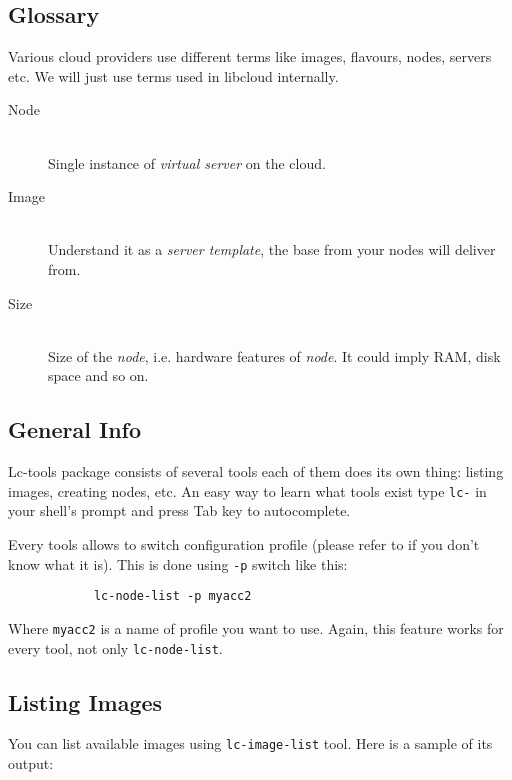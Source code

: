 \documentclass[a4paper]{report}
\begin{document}
         \subsection{Glossary}
            Various cloud providers use different terms like images, flavours, nodes,
            servers etc. We will just use terms used in libcloud internally. 

            \begin{description}
               \item[Node] \hfill \\
               Single instance of \textit{virtual server} on the cloud. 
               \item[Image] \hfill \\
               Understand it as a \textit{server template}, the base from your nodes
               will deliver from.
               \item[Size] \hfill \\
               Size of the \textit{node}, i.e. hardware features of \textit{node}. 
               It could imply RAM, disk space and so on.
            \end{description}
         \subsection{General Info}
         Lc-tools package consists of several tools each of them does its own thing:
         listing images, creating nodes, etc. An easy way to learn what tools exist
         type \texttt{lc-} in your shell's prompt and press Tab key to autocomplete.

         Every tools allows to switch configuration profile (please refer 
         to  if you don't know what it is). This is done using 
         \texttt{-p} switch like this:

            \begin{verbatim}
            lc-node-list -p myacc2
            \end{verbatim}

         Where \texttt{myacc2} is a name of profile you want to use. Again, this
         feature works for every tool, not only \texttt{lc-node-list}.

         \subsection{Listing Images}
            You can list available images using \texttt{lc-image-list} tool. Here
            is a sample of its output:
\end{document}
